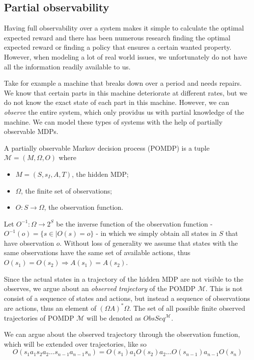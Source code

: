 \subsection*{Partial observability}
Having full observability over a system makes it simple to calculate the optimal expected reward and there has been numerous research finding the optimal expected reward or finding a policy that ensures a certain wanted property. However, when modeling a lot of real world issues, we unfortunately do not have all the information readily available to us.

Take for example a machine that breaks down over a period and needs repairs\cite{p:maintenance}. We know that certain parts in this machine deteriorate at different rates, but we do not know the exact state of each part in this machine. However, we can \textit{observe} the entire system, which only providus us with partial knowledge of the machine. We can model these types of systems with the help of partially observable MDPs.

\begin{definition}[POMDP]
	A partially observable Markov decision process (POMDP) is a tuple $\mathcal{M}=(M, \Omega, O)$ where 
	\begin{itemize}
		\item $M=(S,s_I,A,T)$, the hidden MDP;
		\item $\Omega$, the finite set of observations;
		\item $O:S\to \Omega$, the observation function. 
	\end{itemize}
\end{definition}

Let $O^{-1}:\Omega\to 2^S$ be the inverse function of the observation function - $O^{-1}(o)=\{s\in \mid O(s)=o\}$ - in which we simply obtain all states in $S$ that have observation $o$.
Without loss of generality we assume that states with the same observations have the same set of available actions, thus $O(s_1)=O(s_2)\Rightarrow A(s_1)=A(s_2)$.

Since the actual states in a trajectory of the hidden MDP are not visible to the observes, we argue about an \textit{observed trajectory} of the POMDP $\mathcal{M}$. This is not consist of a sequence of states and actions, but instead a sequence of observations are actions, thus an element of $(\Omega A)^*\Omega$. The set of all possible finite observed trajectories of POMDP $\mathcal{M}$ will be denoted as $ObsSeq^{\mathcal{M}}$.

We can argue about the observed trajectory through the observation function, which will be extended over trajectories, like so
\[O(s_1 a_1 s_2 a_2\dots s_{n-1} a_{n-1} s_n) = O(s_1) a_1 O(s_2) a_2\dots O(s_{n-1}) a_{n-1} O(s_n)\]

